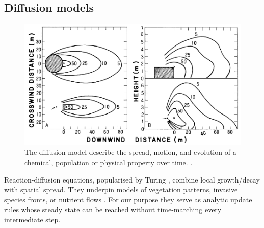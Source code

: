 \subsection{Diffusion models}

\begin{figure}[H]
    \centering
    \includegraphics[]{diffusion-example-Okubo2001.png}
    \caption{The diffusion model describe the spread, motion, and evolution of a chemical, population or physical property over time. \cite{Okubo2001}.}
    \label{fig:diffusion-model-teaser}    
\end{figure}

Reaction-diffusion equations, popularised by Turing \cite{Turing1952}, combine local growth/decay with spatial spread. They underpin models of vegetation patterns, invasive species fronts, or nutrient flows \cite{Cosner2008}. For our purpose they serve as analytic update rules whose steady state can be reached without time-marching every intermediate step.



